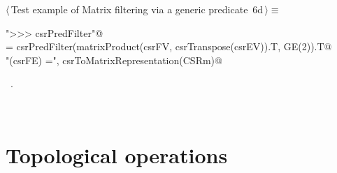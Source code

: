 \documentclass[11pt,oneside]{article}	%
\begin{document}
\begin{flushleft} \small
\begin{minipage}{\linewidth} \label{scrap16}
\protect{}$\langle\,$Test example of Matrix filtering via a generic predicate\nobreak\ {\footnotesize 6d}$\,\rangle\equiv$
\vspace{-1ex}
\begin{list}{}{} \item
\mbox{}\verb@print "\n>>> csrPredFilter"@\\
\mbox{}\verb@CSRm = csrPredFilter(matrixProduct(csrFV, csrTranspose(csrEV)).T, GE(2)).T@\\
\mbox{}\verb@print "\nccsrPredFilter(csrFE) =\n", csrToMatrixRepresentation(CSRm)@\\
\mbox{}\verb@@{\NWsep}
\end{list}
\vspace{-1ex}
\footnotesize\addtolength{\baselineskip}{-1ex}
\begin{list}{}{\setlength{\itemsep}{-\parsep}\setlength{\itemindent}{-\leftmargin}}
\item \NWtxtMacroRefIn\ .
\end{list}
\end{minipage}\\[4ex]
\end{flushleft}

\section{Topological operations}
\end{document}
